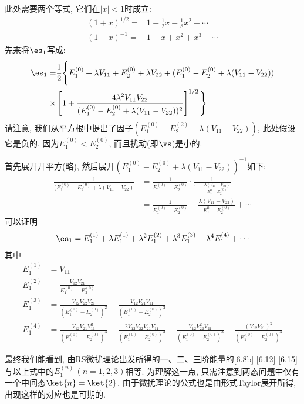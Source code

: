 此处需要两个等式, 它们在$|x| < 1$时成立:
\begin{align}
	(1+x)^{1/2} =& 1 + \frac{1}{2} x - \frac{1}{8} x^2 + \cdots\\
	(1-x)^{-1}  =& 1 +x +x^2 +x^3+\cdots
\end{align}
先来将$\es_1$写成:
\begin{align*}
\es_1 = & \frac{1}{2} \Bigg\{ E_1^{(0)} + \lambda V_{11} + E_2^{(0)} + \lambda V_{22} + (E_1^{(0)} -E_2^{(0)} +\lambda(V_{11} - V_{22}) ) \\
\times & \left[1 + \frac{4\lambda^2V_{11}V_{22}}{(E_1^{(0)}  - E_2^{(0)} + \lambda(V_{11}-V_{22}) )^2} \right]^{1/2}
     \Bigg\}
\end{align*}
请注意, 
我们从平方根中提出了因子$(E_1^{(0)} - E_2^{(2)} +\lambda(V_{11}-V_{22})) $, 
此处假设它是负的, 
因为$E_1^{(0)}<E_2^{(0)}$, 
而且扰动(即$\vs$)是小的.


首先展开开平方(略), 
然后展开$(E_1^{(0)}-E_2^{(0)} + \lambda(V_{11}-V_{22}))^{-1}$如下:
\begin{align*}
	\frac{1}{(E_1^{(0)}-E_2^{(0)} + \lambda(V_{11}-V_{22})} & =\frac{1}{E_1^{(0)} - E_2^{(0) }}\cdot \frac{1}{1+\frac{\lambda(V_{11}-V_{22}) }{E_1^{0} -E_2^{(0)} }}\\
		& = \frac{1}{E_1^{(0)} - E_2^{(0)}} - \frac{\lambda(V_{11}-V_{22}) }{E_1^{0} -E_2^{(0)} }+\cdots
\end{align*}
可以证明
\begin{align}
\es_1 = E_1^{(1)} + \lambda E_1^{(1)} + \lambda^2 E_1^{(2)} + \lambda^3 E_1^{(3)} + \lambda^4 E_1^{(4)} + \cdots
\end{align}
其中
\begin{subequations}
	\begin{align}
	E_1^{(1)} &= V_{11} \\
	E_1^{(2)} &= \frac{V_{12}V_{21}}{E_1^{(0)} - E_2^{(0)}} \\
	E_1^{(3)} &= \frac{V_{12} V_{22} V_{21} }{(E_1^{(0)} - E_2^{(0)})^2} 
                   - \frac{V_{12} V_{21} V_{11} }{ (E_1^{(0)} - E_2^{(0)})^2 }\\
	E_1^{(4)} &= \frac{V_{12} V_{21} V_{11}^2 }{(E_1^{(0)} - E_2^{(0)})^3} 
                   - \frac{2 V_{12} V_{22} V_{21} V_{11} }{(E_1^{(0)} - E_2^{(0)})^3}
                   + \frac{V_{12} V_{22}^2 V_{21} }{(E_1^{(0)} - E_2^{(0)})^3}
                   - \frac{ (V_{12} V_{21})^2 }{(E_1^{(0)} - E_2^{(0)})^3}
	\end{align}
\end{subequations}

最终我们能看到,
由RS微扰理论出发所得的一、二、三阶能量的\autoref{6.8b} \autoref{6.12}
\autoref{6.15}与以上式中的$E_1^{(n)}\,(n=1,2,3)$相等. 
为理解这一点, 
只需注意到两态问题中仅有一个中间态$\ket{n} = \ket{2}$. 
由于微扰理论的公式也是由形式Taylor展开所得, 
出现这样的对应也是可期的. 


